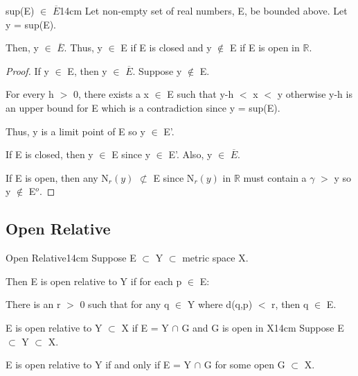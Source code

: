 	\vspace{0.5cm}



	\begin{wtheorem}{sup(E) $\in$ $\overline{E}$}{14cm}
		Let non-empty set of real numbers, E, be bounded above.
        Let y = sup(E).
		
		Then, y $\in$ $\overline{E}$.
        Thus, y $\in$ E if E is closed
		and y $\not \in$ E if E is open in $\mathbb{R}$.
	\end{wtheorem}
	
	\begin{proof}
		If y $\in$ E, then y $\in$ $\overline{E}$. Suppose y $\not \in$ E.

		For every h $>$ 0, there exists a x $\in$ E such that y-h $<$ x $<$ y
		otherwise y-h is an upper bound for E which is a contradiction
		since y = sup(E).

		Thus, y is a limit point of E so y $\in$ E'.

		If E is closed, then y $\in$ E since y $\in$ E'.	
		Also, y $\in$ $\overline{E}$.
		
		If E is open, then any N$_r(y)$ $\not \subset$ E since 
		N$_r(y)$ in $\mathbb{R}$ must contain a $\gamma$ $>$ y
		so y $\not \in$ E$^o$.
	\end{proof}

	\vspace{0.5cm}





\subsection{ Open Relative }

	\begin{definition}{Open Relative}{14cm}
		Suppose E $\subset$ Y $\subset$ metric space X.

		Then E is open relative to Y if for each p $\in$ E:
		
		\hspace{1cm}
		There is an r $>$ 0 such that for any q $\in$ Y where d(q,p) $<$ r,
		then q $\in$ E.
	\end{definition}
	
	\newpage



	\begin{wtheorem}{E is open relative to Y $\subset$ X
	if E = Y $\cap$ G and G is open in X}{14cm}
	Suppose E $\subset$ Y $\subset$ X.

	E is open relative to Y if and only if E = Y $\cap$ G
	for some open G $\subset$ X.
	\end{wtheorem}
	

